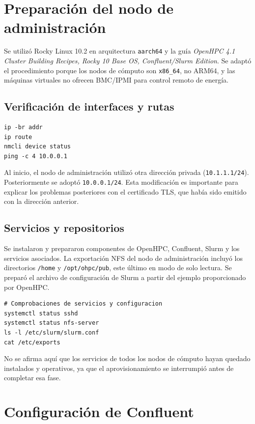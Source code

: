 \documentclass[12pt,a4paper]{article}
\begin{document}
\section{Preparación del nodo de administración}
Se utilizó Rocky Linux 10.2 en arquitectura \texttt{aarch64} y la guía \emph{OpenHPC 4.1 Cluster Building Recipes, Rocky 10 Base OS, Confluent/Slurm Edition}. Se adaptó el procedimiento porque los nodos de cómputo son \texttt{x86\_64}, no ARM64, y las máquinas virtuales no ofrecen BMC/IPMI para control remoto de energía.

\subsection{Verificación de interfaces y rutas}
\begin{lstlisting}
ip -br addr
ip route
nmcli device status
ping -c 4 10.0.0.1
\end{lstlisting}
Al inicio, el nodo de administración utilizó otra dirección privada (\texttt{10.1.1.1/24}). Posteriormente se adoptó \texttt{10.0.0.1/24}. Esta modificación es importante para explicar los problemas posteriores con el certificado TLS, que había sido emitido con la dirección anterior.

\subsection{Servicios y repositorios}
Se instalaron y prepararon componentes de OpenHPC, Confluent, Slurm y los servicios asociados. La exportación NFS del nodo de administración incluyó los directorios \texttt{/home} y \texttt{/opt/ohpc/pub}, este último en modo de solo lectura. Se preparó el archivo de configuración de Slurm a partir del ejemplo proporcionado por OpenHPC.

\begin{lstlisting}
# Comprobaciones de servicios y configuracion
systemctl status sshd
systemctl status nfs-server
ls -l /etc/slurm/slurm.conf
cat /etc/exports
\end{lstlisting}
No se afirma aquí que los servicios de todos los nodos de cómputo hayan quedado instalados y operativos, ya que el aprovisionamiento se interrumpió antes de completar esa fase.

\section{Configuración de Confluent}
\end{document}
